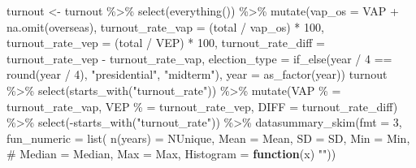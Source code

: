 \documentclass[
  letterpaper,
  DIV=11,
  numbers=noendperiod]{scrartcl}
\newenvironment{Shaded}{\begin{snugshade}}{\end{snugshade}}
\newcommand{\AttributeTok}[1]{\textcolor[rgb]{0.40,0.45,0.13}{#1}}
\newcommand{\CommentTok}[1]{\textcolor[rgb]{0.37,0.37,0.37}{#1}}
\newcommand{\ControlFlowTok}[1]{\textcolor[rgb]{0.00,0.23,0.31}{\textbf{#1}}}
\newcommand{\DecValTok}[1]{\textcolor[rgb]{0.68,0.00,0.00}{#1}}
\newcommand{\FunctionTok}[1]{\textcolor[rgb]{0.28,0.35,0.67}{#1}}
\newcommand{\NormalTok}[1]{\textcolor[rgb]{0.00,0.23,0.31}{#1}}
\newcommand{\OtherTok}[1]{\textcolor[rgb]{0.00,0.23,0.31}{#1}}
\newcommand{\SpecialCharTok}[1]{\textcolor[rgb]{0.37,0.37,0.37}{#1}}
\newcommand{\StringTok}[1]{\textcolor[rgb]{0.13,0.47,0.30}{#1}}
\begin{document}
\begin{Shaded}
\begin{Highlighting}[]
\NormalTok{turnout }\OtherTok{\textless{}{-}}\NormalTok{ turnout }\SpecialCharTok{\%\textgreater{}\%} 
  \FunctionTok{select}\NormalTok{(}\FunctionTok{everything}\NormalTok{()) }\SpecialCharTok{\%\textgreater{}\%} 
  \FunctionTok{mutate}\NormalTok{(}\AttributeTok{vap\_os =}\NormalTok{ VAP }\SpecialCharTok{+} \FunctionTok{na.omit}\NormalTok{(overseas),}
         \AttributeTok{turnout\_rate\_vap =}\NormalTok{ (total }\SpecialCharTok{/}\NormalTok{ vap\_os) }\SpecialCharTok{*} \DecValTok{100}\NormalTok{,}
         \AttributeTok{turnout\_rate\_vep =}\NormalTok{ (total }\SpecialCharTok{/}\NormalTok{ VEP) }\SpecialCharTok{*} \DecValTok{100}\NormalTok{,}
         \AttributeTok{turnout\_rate\_diff =}\NormalTok{ turnout\_rate\_vep }\SpecialCharTok{{-}}\NormalTok{ turnout\_rate\_vap,}
         \AttributeTok{election\_type =} \FunctionTok{if\_else}\NormalTok{(year }\SpecialCharTok{/} \DecValTok{4} \SpecialCharTok{==} \FunctionTok{round}\NormalTok{(year }\SpecialCharTok{/} \DecValTok{4}\NormalTok{),}
                                 \StringTok{"presidential"}\NormalTok{, }\StringTok{"midterm"}\NormalTok{),}
         \AttributeTok{year =} \FunctionTok{as\_factor}\NormalTok{(year))}
\NormalTok{turnout }\SpecialCharTok{\%\textgreater{}\%} 
  \FunctionTok{select}\NormalTok{(}\FunctionTok{starts\_with}\NormalTok{(}\StringTok{"turnout\_rate"}\NormalTok{)) }\SpecialCharTok{\%\textgreater{}\%} 
  \FunctionTok{mutate}\NormalTok{(}\StringTok{\textquotesingle{}VAP \%\textquotesingle{}} \OtherTok{=}\NormalTok{ turnout\_rate\_vap,}
         \StringTok{\textquotesingle{}VEP \%\textquotesingle{}} \OtherTok{=}\NormalTok{ turnout\_rate\_vep,}
         \AttributeTok{DIFF =}\NormalTok{ turnout\_rate\_diff) }\SpecialCharTok{\%\textgreater{}\%} 
  \FunctionTok{select}\NormalTok{(}\SpecialCharTok{{-}}\FunctionTok{starts\_with}\NormalTok{(}\StringTok{"turnout\_rate"}\NormalTok{)) }\SpecialCharTok{\%\textgreater{}\%} 
  \FunctionTok{datasummary\_skim}\NormalTok{(}\AttributeTok{fmt =} \DecValTok{3}\NormalTok{,}
                   \AttributeTok{fun\_numeric =} \FunctionTok{list}\NormalTok{(}
                     \StringTok{\textquotesingle{}n(years)\textquotesingle{}} \OtherTok{=}\NormalTok{ NUnique,}
                     \AttributeTok{Mean =}\NormalTok{ Mean,}
                     \AttributeTok{SD =}\NormalTok{ SD,}
                     \AttributeTok{Min =}\NormalTok{ Min,}
                     \CommentTok{\# Median = Median,}
                     \AttributeTok{Max =}\NormalTok{ Max,}
                     \AttributeTok{Histogram =} \ControlFlowTok{function}\NormalTok{(x) }\StringTok{""}\NormalTok{))}
\end{Highlighting}
\end{Shaded}
\end{document}

